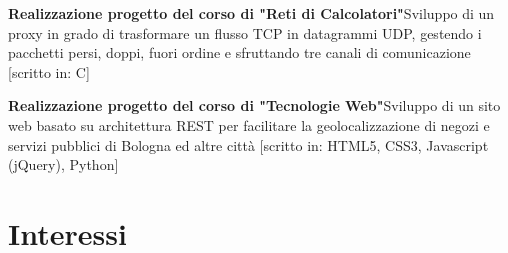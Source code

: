 \documentclass[11pt,a4paper,sans]{moderncv} %
\begin{document}
 {\textbf{Realizzazione progetto del corso di "Reti di Calcolatori"}\newline Sviluppo di un proxy in grado di trasformare un flusso TCP in datagrammi UDP, gestendo i pacchetti persi, doppi, fuori ordine e sfruttando tre canali di comunicazione [scritto in: C]}

 {\textbf{Realizzazione progetto del corso di "Tecnologie Web"}\newline Sviluppo di un sito web basato su architettura REST per facilitare la geolocalizzazione di negozi e servizi pubblici di Bologna ed altre città [scritto in: HTML5, CSS3, Javascript (jQuery), Python]}







\section{Interessi}

\renewcommand{\listitemsymbol}{-~} %



\end{document}
